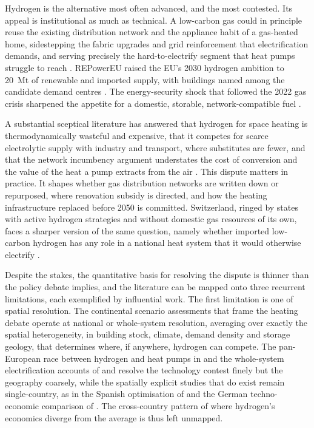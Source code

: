 Hydrogen is the alternative most often advanced, and the most contested. Its
appeal is institutional as much as technical. A low-carbon gas could in principle
reuse the existing distribution network and the appliance habit of a gas-heated
home, sidestepping the fabric upgrades and grid reinforcement that electrification
demands, and serving precisely the hard-to-electrify segment that heat pumps
struggle to reach \citep{Dodds2015,Bothe2021}. REPowerEU
raised the EU's 2030 hydrogen ambition to 20~Mt of renewable and imported supply,
with buildings named among the candidate demand centres
\citep{REpowerEU2022, EUCommissionSWD2022}. The energy-security shock that
followed the 2022 gas crisis sharpened the appetite for a domestic, storable,
network-compatible fuel \citep{Goldthau2023Eu, Zakeri2022Pandemic}.

A substantial sceptical literature has answered that hydrogen for space heating is
thermodynamically wasteful and expensive, that it competes for scarce electrolytic
supply with industry and transport, where substitutes are fewer, and that the
network incumbency argument understates the cost of conversion and the value of
the heat a pump extracts from the air
\citep{Rosenow2022PipeDream,Cebon2022}.
This dispute matters in practice. It shapes whether gas distribution
networks are written down or repurposed, where renovation subsidy is directed,
and how the heating infrastructure replaced before 2050 is committed. Switzerland,
ringed by states with active hydrogen strategies and without domestic gas
resources of its own, faces a sharper version of the same question, namely whether
imported low-carbon hydrogen has any role in a national heat system that it would
otherwise electrify \citep{Gabrielli2020,BfE2023}.

Despite the stakes, the quantitative basis for resolving the dispute is thinner
than the policy debate implies, and the literature can be mapped onto three
recurrent limitations, each exemplified by influential work. The first limitation
is one of spatial resolution. The continental scenario assessments that frame the
heating debate operate at national or whole-system resolution, averaging over
exactly the spatial heterogeneity, in building stock, climate, demand density and
storage geology, that determines where, if anywhere, hydrogen can compete. The
pan-European race between hydrogen and heat pumps in \citet{Billerbeck2023Race}
and the whole-system electrification accounts of \citet{Hoseinpoori2022} and
\citet{Brown2018Synergies} resolve the technology contest finely but the geography
coarsely, while the spatially explicit studies that do exist remain single-country,
as in the Spanish optimisation of \citet{Maestre2022} and the German
techno-economic comparison of \citet{Huckebrink2022}. The cross-country pattern of
where hydrogen's economics diverge from the average is thus left unmapped.

